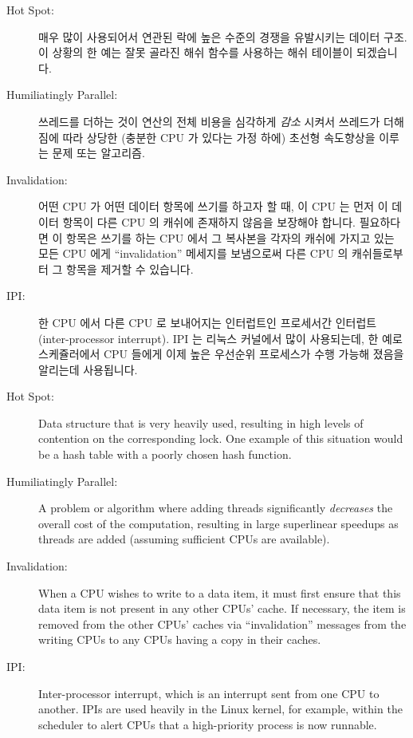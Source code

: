 \begin{description}
\fi

\item[Hot Spot:]
	매우 많이 사용되어서 연관된 락에 높은 수준의 경쟁을 유발시키는 데이터
	구조.
	이 상황의 한 예는 잘못 골라진 해쉬 함수를 사용하는 해쉬 테이블이
	되겠습니다.
\item[Humiliatingly Parallel:]
	쓰레드를 더하는 것이 연산의 전체 비용을 심각하게 \emph{감소} 시켜서
	쓰레드가 더해짐에 따라 상당한 (충분한 CPU 가 있다는 가정 하에) 초선형
	속도향상을 이루는 문제 또는 알고리즘.
\item[Invalidation:]
	어떤 CPU 가 어떤 데이터 항목에 쓰기를 하고자 할 때, 이 CPU 는 먼저 이
	데이터 항목이 다른 CPU 의 캐쉬에 존재하지 않음을 보장해야 합니다.
	필요하다면 이 항목은 쓰기를 하는 CPU 에서 그 복사본을 각자의 캐쉬에
	가지고 있는 모든 CPU 에게 ``invalidation'' 메세지를 보냄으로써 다른 CPU
	의 캐쉬들로부터 그 항목을 제거할 수 있습니다.
\item[IPI:]
	한 CPU 에서 다른 CPU 로 보내어지는 인터럽트인 프로세서간 인터럽트
	(inter-processor interrupt).
	IPI 는 리눅스 커널에서 많이 사용되는데, 한 예로 스케쥴러에서 CPU 들에게
	이제 높은 우선순위 프로세스가 수행 가능해 졌음을 알리는데 사용됩니다.

\iffalse

\item[Hot Spot:]
	Data structure that is very heavily used, resulting in high
	levels of contention on the corresponding lock.
	One example of this situation would be a hash table with
	a poorly chosen hash function.
\item[Humiliatingly Parallel:]
	A problem or algorithm where adding threads significantly
	\emph{decreases} the overall cost of the computation, resulting in
	large superlinear speedups as threads are added (assuming sufficient
	CPUs are available).
\item[Invalidation:]
	When a CPU wishes to write to a data item, it must first ensure
	that this data item is not present in any other CPUs' cache.
	If necessary, the item is removed from the other CPUs' caches
	via ``invalidation'' messages from the writing CPUs to any
	CPUs having a copy in their caches.
\item[IPI:]
	Inter-processor interrupt, which is an
	interrupt sent from one CPU to another.
	IPIs are used heavily in the Linux kernel, for example, within
	the scheduler to alert CPUs that a high-priority process is now
	runnable.


\end{description}

